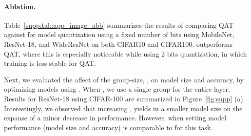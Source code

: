 \paragraph{Ablation.} Table~\ref{supp:tab:app_image_abb} summarizes the results of comparing QAT against \diffq for model quantization using a fixed number of bits using MobileNet, ResNet-18, and WideResNet on both CIFAR10 and CIFAR100. \diffq outperforms QAT, where this is especially noticeable while using 2 bits quantization, in which training is less stable for QAT. 

Next, we evaluated the affect of the group-size, , on model size and accuracy, by optimizing \diffq models using . When , we use a single group for the entire layer. Results for ResNet-18 using CIFAR-100 are summarized in Figure~\ref{fig:supp} (a). Interestingly, we observed that increasing , yields in a smaller model size on the expanse of a minor decrease in performance. However, when setting  model performance (model size and accuracy) is comparable to  for this task.

